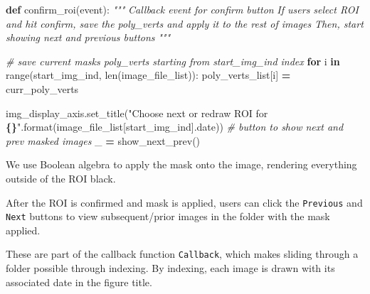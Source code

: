 \documentclass[
]{article}
\newenvironment{Shaded}{\begin{snugshade}}{\end{snugshade}}
\newcommand{\BuiltInTok}[1]{#1}
\newcommand{\CommentTok}[1]{\textcolor[rgb]{0.56,0.35,0.01}{\textit{#1}}}
\newcommand{\ControlFlowTok}[1]{\textcolor[rgb]{0.13,0.29,0.53}{\textbf{#1}}}
\newcommand{\KeywordTok}[1]{\textcolor[rgb]{0.13,0.29,0.53}{\textbf{#1}}}
\newcommand{\NormalTok}[1]{#1}
\newcommand{\OperatorTok}[1]{\textcolor[rgb]{0.81,0.36,0.00}{\textbf{#1}}}
\newcommand{\SpecialCharTok}[1]{\textcolor[rgb]{0.81,0.36,0.00}{\textbf{#1}}}
\newcommand{\StringTok}[1]{\textcolor[rgb]{0.31,0.60,0.02}{#1}}
\begin{document}
\begin{Shaded}
\begin{Highlighting}[]
\KeywordTok{def}\NormalTok{ confirm\_roi(event):}
    \CommentTok{"""}
\CommentTok{    Callback event for confirm button}
\CommentTok{    If users select ROI and hit confirm, save the poly\_verts and apply it to the rest of images}
\CommentTok{    Then, start showing next and previous buttons}
\CommentTok{    """}

    \CommentTok{\# save current mask\textquotesingle{}s poly\_verts starting from start\_img\_ind index}
    \ControlFlowTok{for}\NormalTok{ i }\KeywordTok{in} \BuiltInTok{range}\NormalTok{(start\_img\_ind, }\BuiltInTok{len}\NormalTok{(image\_file\_list)):}
\NormalTok{        poly\_verts\_list[i] }\OperatorTok{=}\NormalTok{ curr\_poly\_verts}

\NormalTok{    img\_display\_axis.set\_title(}\StringTok{"Choose next or redraw ROI for }\SpecialCharTok{\{\}}\StringTok{"}\NormalTok{.}\BuiltInTok{format}\NormalTok{(image\_file\_list[start\_img\_ind].date))}
    \CommentTok{\# button to show next and prev masked images}
\NormalTok{    \_ }\OperatorTok{=}\NormalTok{ show\_next\_prev()}
\end{Highlighting}
\end{Shaded}

We use Boolean algebra to apply the mask onto the image, rendering everything outside of the ROI black.

After the ROI is confirmed and mask is applied, users can click the \texttt{Previous} and \texttt{Next} buttons to view subsequent/prior images in the folder with the mask applied.

These are part of the callback function \texttt{Callback}, which makes sliding through a folder possible through indexing. By indexing, each image is drawn with its associated date in the figure title.
\end{document}
